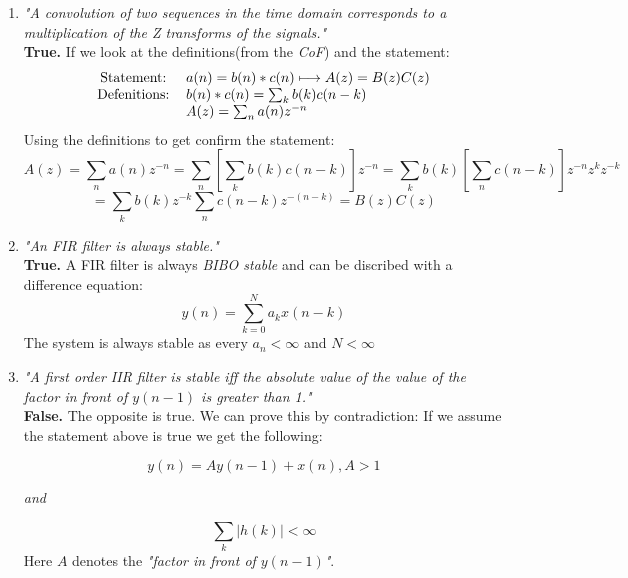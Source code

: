 \documentclass{article}
\begin{document}
\begin{enumerate}
\begin{enumerate}
            \item %
                \emph{"A convolution of two sequences in the time domain corresponds to a multiplication of the Z transforms of the signals."}
                \\
                \textbf{True.} If we look at the definitions(from the \emph{CoF}) and the
                statement:
                \\
                \begin{align*}
                    \begin{tabular}{c l}
                        Statement: & $a(n) = b(n)*c(n) \longmapsto A(z) = B(z)C(z)$ \\
                        Defenitions: & $b(n)*c(n) = \sum_kb(k)c(n-k)$ \\
                         & $A(z) = \sum_na(n)z^{-n}$ \\
                    \end{tabular}
                \end{align*}
                Using the definitions to get confirm the statement:
                $$
                    A(z) = \sum_na(n)z^{-n} = \sum_n \left[ \sum_kb(k)c(n-k) \right]z^{-n}
                    = \sum_kb(k) \left[ \sum_nc(n-k) \right] z^{-n}z^{k}z^{-k} 
                $$ $$
                = \sum_kb(k)z^{-k} \sum_nc(n-k)z^{-(n-k)} = B(z) C(z)
                $$
            \item %
                \emph{"An FIR filter is always stable."}
                \\
                \textbf{True.}
                A FIR filter is always \emph{BIBO stable} and can be discribed
                with a difference equation:
                $$ 
                y(n) = \sum_{k=0}^{N} a_k x(n-k)
                $$
                The system is always stable as every 
                $a_n < \infty$ 
                and 
                $N<\infty$
                
            \item %
                \emph{"A first order IIR filter is stable iff the absolute value of the value of the factor in front of $y(n-1)$ is greater than 1."}
                \\
                \textbf{False.} The opposite is true. We can prove this by
                contradiction: If we assume the statement above is true we get
                the following:
                
                $$
                    y(n) = Ay(n-1) + x(n), A > 1
                $$
                \begin{center}
                    \textit{and}
                \end{center}
                $$
                   \sum_k |h(k)| < \infty
                $$
                Here $A$ denotes the \emph{"factor in front of $y(n-1)$"}.
                

\end{enumerate}
\end{enumerate}
\end{document}
